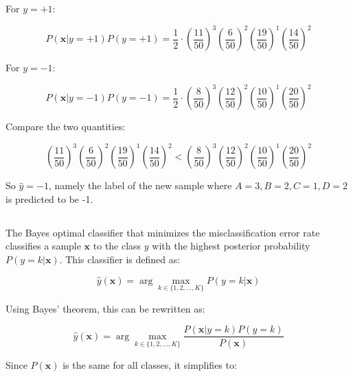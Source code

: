 \documentclass[oneside,solution]{seu-ml-assign}
\begin{document}
For \( y = +1 \):

\begin{equation}
  P(\mathbf{x} | y = +1) P(y = +1) = \frac{1}{2} \cdot \left( \frac{11}{50} \right)^3 \left( \frac{6}{50} \right)^2 \left( \frac{19}{50} \right)^1 \left( \frac{14}{50} \right)^2
\end{equation}

For \( y = -1 \):

\begin{equation}
  P(\mathbf{x} | y = -1) P(y = -1) = \frac{1}{2} \cdot \left( \frac{8}{50} \right)^3 \left( \frac{12}{50} \right)^2 \left( \frac{10}{50} \right)^1 \left( \frac{20}{50} \right)^2
\end{equation}

Compare the two quantities:

\begin{equation}
  \left( \frac{11}{50} \right)^3 \left( \frac{6}{50} \right)^2 \left( \frac{19}{50} \right)^1 \left( \frac{14}{50} \right)^2 < \left( \frac{8}{50} \right)^3 \left( \frac{12}{50} \right)^2 \left( \frac{10}{50} \right)^1 \left( \frac{20}{50} \right)^2
\end{equation}


So $\hat{y} = -1$, namely the label of the new sample where $A=3, B=2, C=1, D=2$is predicted to be -1.


\subsection{}
The Bayes optimal classifier that minimizes the misclassification error rate classifies a sample \(\mathbf{x}\) to the class \(y\) with the highest posterior probability \(P(y = k | \mathbf{x})\). This classifier is defined as:

\begin{equation}
  \hat{y}(\mathbf{x}) = \arg\max_{k \in \{1, 2, \ldots, K\}} P(y = k | \mathbf{x})
\end{equation}

Using Bayes' theorem, this can be rewritten as:

\begin{equation}
  \hat{y}(\mathbf{x}) = \arg\max_{k \in \{1, 2, \ldots, K\}} \frac{P(\mathbf{x} | y = k) P(y = k)}{P(\mathbf{x})}
\end{equation}

Since \(P(\mathbf{x})\) is the same for all classes, it simplifies to:
\end{document}
